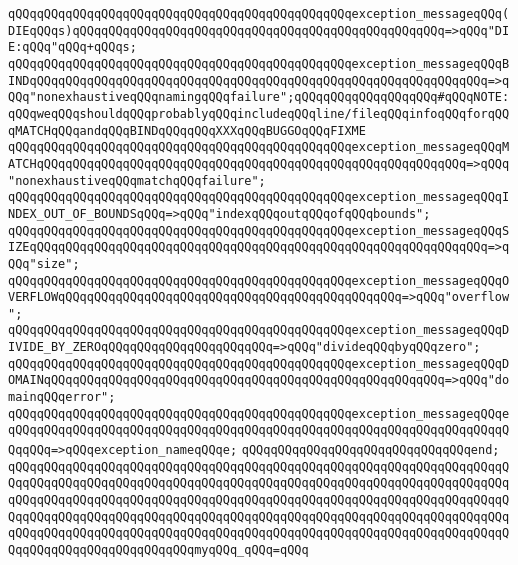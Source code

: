 \newline
\verb|qQQqqQQqqQQqqQQqqQQqqQQqqQQqqQQqqQQqqQQqqQQqqQQqexception_messageqQQq(DIEqQQqs)qQQqqQQqqQQqqQQqqQQqqQQqqQQqqQQqqQQqqQQqqQQqqQQqqQQq=>qQQq"DIE:qQQq"qQQq+qQQqs;|\newline
\verb|qQQqqQQqqQQqqQQqqQQqqQQqqQQqqQQqqQQqqQQqqQQqqQQqexception_messageqQQqBINDqQQqqQQqqQQqqQQqqQQqqQQqqQQqqQQqqQQqqQQqqQQqqQQqqQQqqQQqqQQqqQQq=>qQQq"nonexhaustiveqQQqnamingqQQqfailure";qQQqqQQqqQQqqQQqqQQq#qQQqNOTE:qQQqweqQQqshouldqQQqprobablyqQQqincludeqQQqline/fileqQQqinfoqQQqforqQQqMATCHqQQqandqQQqBINDqQQqqQQqXXXqQQqBUGGOqQQqFIXME|\newline
\verb|qQQqqQQqqQQqqQQqqQQqqQQqqQQqqQQqqQQqqQQqqQQqqQQqexception_messageqQQqMATCHqQQqqQQqqQQqqQQqqQQqqQQqqQQqqQQqqQQqqQQqqQQqqQQqqQQqqQQqqQQq=>qQQq"nonexhaustiveqQQqmatchqQQqfailure";|\newline
\verb|qQQqqQQqqQQqqQQqqQQqqQQqqQQqqQQqqQQqqQQqqQQqqQQqexception_messageqQQqINDEX_OUT_OF_BOUNDSqQQq=>qQQq"indexqQQqoutqQQqofqQQqbounds";|\newline
\verb|qQQqqQQqqQQqqQQqqQQqqQQqqQQqqQQqqQQqqQQqqQQqqQQqexception_messageqQQqSIZEqQQqqQQqqQQqqQQqqQQqqQQqqQQqqQQqqQQqqQQqqQQqqQQqqQQqqQQqqQQqqQQq=>qQQq"size";|\newline
\verb|qQQqqQQqqQQqqQQqqQQqqQQqqQQqqQQqqQQqqQQqqQQqqQQqexception_messageqQQqOVERFLOWqQQqqQQqqQQqqQQqqQQqqQQqqQQqqQQqqQQqqQQqqQQqqQQq=>qQQq"overflow";|\newline
\verb|qQQqqQQqqQQqqQQqqQQqqQQqqQQqqQQqqQQqqQQqqQQqqQQqexception_messageqQQqDIVIDE_BY_ZEROqQQqqQQqqQQqqQQqqQQqqQQq=>qQQq"divideqQQqbyqQQqzero";|\newline
\verb|qQQqqQQqqQQqqQQqqQQqqQQqqQQqqQQqqQQqqQQqqQQqqQQqexception_messageqQQqDOMAINqQQqqQQqqQQqqQQqqQQqqQQqqQQqqQQqqQQqqQQqqQQqqQQqqQQqqQQq=>qQQq"domainqQQqerror";|\newline
\verb|qQQqqQQqqQQqqQQqqQQqqQQqqQQqqQQqqQQqqQQqqQQqqQQqexception_messageqQQqeqQQqqQQqqQQqqQQqqQQqqQQqqQQqqQQqqQQqqQQqqQQqqQQqqQQqqQQqqQQqqQQqqQQqqQQqqQQq=>qQQqexception_nameqQQqe;|\newline
\verb|qQQqqQQqqQQqqQQqqQQqqQQqqQQqqQQqend;|\newline
\newline
\verb|qQQqqQQqqQQqqQQqqQQqqQQqqQQqqQQqqQQqqQQqqQQqqQQqqQQqqQQqqQQqqQQqqQQqqQQqqQQqqQQqqQQqqQQqqQQqqQQqqQQqqQQqqQQqqQQqqQQqqQQqqQQqqQQqqQQqqQQqqQQqqQQqqQQqqQQqqQQqqQQqqQQqqQQqqQQqqQQqqQQqqQQqqQQqqQQqqQQqqQQqqQQqqQQqqQQqqQQqqQQqqQQqqQQqqQQqqQQqqQQqqQQqqQQqqQQqqQQqqQQqqQQqqQQqqQQqqQQqqQQqqQQqqQQqqQQqqQQqqQQqqQQqqQQqqQQqqQQqqQQqqQQqqQQqqQQqqQQqqQQqqQQqqQQqqQQqqQQqqQQqqQQqqQQqqQQqqQQqmyqQQq_qQQq=qQQq|\newline
